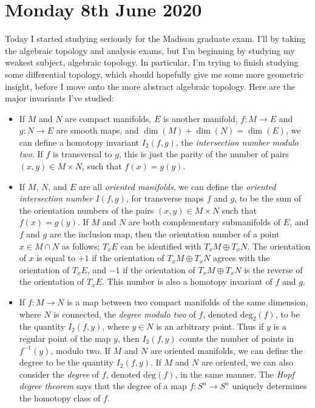 \documentclass[openany,nobib,nols,a4paper,twoside,symmetric,justified,notoc]{tufte-book}
\theoremstyle{plain}
\theoremstyle{remark}
\theoremstyle{definition}
\begin{document}
\chapter{Monday 8th June 2020}

Today I started studying seriously for the Madison graduate exam. I'll by taking the algebraic topology and analysis exams, but I'm beginning by studying my weakest subject, algebraic topology. In particular, I'm trying to finish studying some differential topology, which should hopefully give me some more geometric insight, before I move onto the more abstract algebraic topology. Here are the major invariants I've studied:
%
\begin{itemize}
    \item If $M$ and $N$ are compact manifolds, $E$ is another manifold, $f: M \to E$ and $g: N \to E$ are smooth maps, and $\dim(M) + \dim(N) = \dim(E)$, we can define a homotopy invariant $I_2(f,g)$, the \emph{intersection number modulo two}. If $f$ is transversal to $g$, this is just the parity of the number of pairs $(x,y) \in M \times N$, such that $f(x) = g(y)$.

    \item If $M$, $N$, and $E$ are all \emph{oriented manifolds}, we can define the \emph{oriented intersection number} $I(f,g)$, for transverse maps $f$ and $g$, to be the sum of the orientation numbers of the pairs $(x,y) \in M \times N$ such that $f(x) = g(y)$. If $M$ and $N$ are both complementary submanifolds of $E$, and $f$ and $g$ are the inclusion map, then the orientation number of a point $x \in M \cap N$ as follows; $T_x E$ can be identified with $T_x M \oplus T_x N$. The orientation of $x$ is equal to $+1$ if the orientation of $T_x M \oplus T_x N$ agrees with the orientation of $T_x E$, and $-1$ if the orientation of $T_x M \oplus T_x N$ is the reverse of the orientation of $T_x E$. This number is also a homotopy invariant of $f$ and $g$.

    \item If $f: M \to N$ is a map between two compact manifolds of the same dimension, where $N$ is connected, the \emph{degree modulo two} of $f$, denoted $\text{deg}_2(f)$, to be the quantity $I_2(f,y)$, where $y \in N$ is an arbitrary point. Thus if $y$ is a regular point of the map $y$, then $I_2(f,y)$ counts the number of points in $f^{-1}(y)$, modulo two. If $M$ and $N$ are oriented manifolds, we can define the degree to be the quantity $I_2(f,y)$. If $M$ and $N$ are oriented, we can also consider the \emph{degree} of $f$, denoted $\text{deg}(f)$, in the same manner. The \emph{Hopf degree theorem} says that the degree of a map $f: S^n \to S^n$ uniquely determines the homotopy class of $f$.


\end{itemize}
\end{document}
